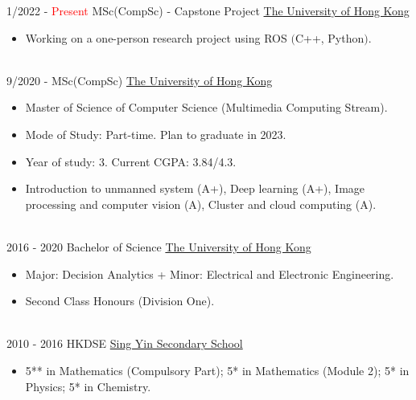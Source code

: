 \documentclass[letterpaper]{twentysecondcv} %
\begin{document}
\begin{twenty} %
\twentyitemshorttest
	{1/2022 - \textcolor{red}{Present}}
	{}
	{MSc(CompSc) - Capstone Project}
	{\href{https://www.msc-cs.hku.hk}{The University of Hong Kong}}
	{}
	{\vspace{-2mm}\begin{itemize}[topsep=0pt,partopsep=0pt]
	\item  Working on a one-person \textcolor{pblue}{research project using ROS $($C++, Python$)$}.
\end{itemize}} \\

	\twentyitemshorttest
    	{9/2020 - }
        {}
        {MSc(CompSc)}
        {\href{https://www.msc-cs.hku.hk}{The University of Hong Kong}}
        {}
        {\vspace{-2mm}\begin{itemize}[topsep=0pt,partopsep=0pt]
        \item Master of Science of Computer Science (Multimedia Computing Stream).
        \item Mode of Study: Part-time. Plan to graduate in 2023.
        \item Year of study: 3. Current CGPA: 3.84/4.3.
        \item Introduction to unmanned system (A+), Deep learning (A+), 	
		Image processing and computer vision (A), Cluster and cloud computing (A).
    \end{itemize}} \\
    
	\twentyitemshorttest
    	{2016 - 2020}
        {}
        {Bachelor of Science}
        {\href{https://www.scifac.hku.hk/prospective/ug/6901-bsc/features}{The University of Hong Kong}}
        {}
        {\vspace{-2mm}\begin{itemize}[topsep=0pt,partopsep=0pt]
        \item Major: Decision Analytics + Minor:  Electrical and Electronic Engineering.
        \item Second Class Honours (Division One).
    \end{itemize}} \\
				
	\twentyitemshorttest
    	{2010 - 2016}
		{}
        {HKDSE}
        {\href{http://www.singyin.edu.hk/en/}{Sing Yin Secondary School}}
        {}
        {\vspace{-2mm}\begin{itemize}[topsep=0pt,partopsep=0pt]
        \item 5** in Mathematics (Compulsory Part); 5* in Mathematics (Module 2); 5* in Physics; 5* in Chemistry.
    \end{itemize}} \\

\end{twenty}
\end{document}

